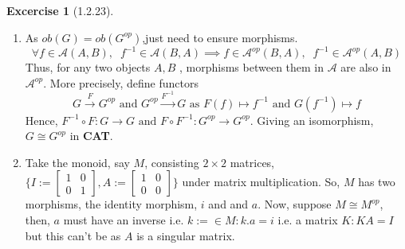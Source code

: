 \documentclass{article}
\theoremstyle{definition}
\newtheorem*{excercise}{Excercise}
\begin{document}
\begin{excercise}[1.2.23] %
	\begin{enumerate}[label=(\alph*)]
		\item As $ob(G)=ob(G^{op})$,just need to ensure morphisms.
			\[\forall f \in \mathcal{A}(A,B) ,\; \; f^{-1} \in \mathcal{A}(B,A) \implies
			f \in \mathcal{A}^{op}(B,A) ,\; \; f^{-1} \in \mathcal{A}^{op}(A,B) \]
			Thus, for any two objects $A,B$ , morphisms between them in $\mathcal{A} $
			are also in $\mathcal{A} ^{op}$. More precisely, define functors
			\[ G \xrightarrow{F} G^{op} \text{ and } G^{op} \xrightarrow{F^{-1}} G \text{ as }
			F(f)\mapsto f^{-1} \text{ and } G(f^{-1}) \mapsto f \]
			Hence, $ F^{-1} \circ F : G \rightarrow G \text{ and } F \circ  F^{-1} : G^{op} \rightarrow G^{op}$.
			Giving an isomorphism, $G\cong G^{op}$  in \textbf{CAT}.
		\item Take the monoid, say $M$, consisting $2\times2$ matrices, $\Bigg\{
				I:=\begin{bmatrix}
					1 & 0 \\
					0 & 1
				\end{bmatrix},
				A:=\begin{bmatrix}
					1 & 0 \\
					0 & 0
			\end{bmatrix}\Bigg\}$ under matrix multiplication.
			So, $M$ has two morphisms, the identity morphism, $i$ and and $a$.
			Now, suppose $M \cong M^{op} $, then, $a$ must have an inverse i.e.
			$ k:= \in M : k.a=i $ i.e. a matrix $K: KA = I$ but this can't be as $A$ is a singular matrix.
	\end{enumerate}
\end{excercise}
\end{document}
